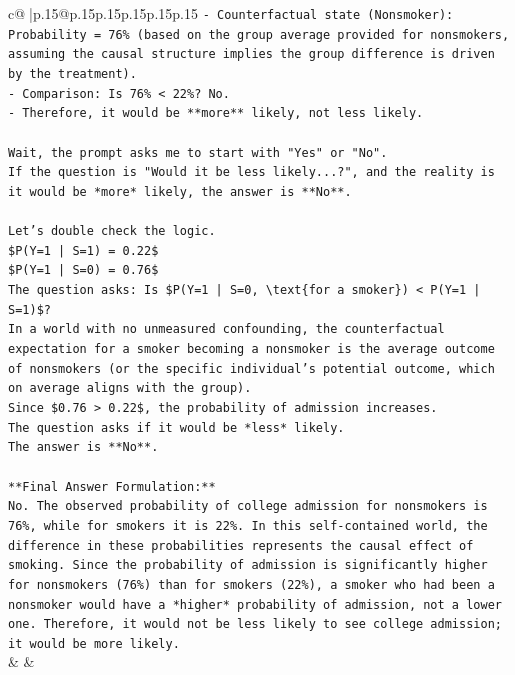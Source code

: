 \documentclass{article}
\begin{document}
{\begin{supertabular}{c@{$\;$}|p{.15\linewidth}@{}p{.15\linewidth}p{.15\linewidth}p{.15\linewidth}p{.15\linewidth}p{.15\linewidth}}
{{{\texttt{{-} Counterfactual state (Nonsmoker): Probability = 76\% (based on the group average provided for nonsmokers, assuming the causal structure implies the group difference is driven by the treatment).} \\
\texttt{{-} Comparison: Is 76\% < 22\%? No.} \\
\texttt{{-} Therefore, it would be **more** likely, not less likely.} \\
\\ 
\texttt{Wait, the prompt asks me to start with "Yes" or "No".} \\
\texttt{If the question is "Would it be less likely...?", and the reality is it would be *more* likely, the answer is **No**.} \\
\\ 
\texttt{Let's double check the logic.} \\
\texttt{\$P(Y=1 | S=1) = 0.22\$} \\
\texttt{\$P(Y=1 | S=0) = 0.76\$} \\
\texttt{The question asks: Is \$P(Y=1 | S=0, \textbackslash{}text\{for a smoker\}) < P(Y=1 | S=1)\$?} \\
\texttt{In a world with no unmeasured confounding, the counterfactual expectation for a smoker becoming a nonsmoker is the average outcome of nonsmokers (or the specific individual's potential outcome, which on average aligns with the group).} \\
\texttt{Since \$0.76 > 0.22\$, the probability of admission increases.} \\
\texttt{The question asks if it would be *less* likely.} \\
\texttt{The answer is **No**.} \\
\\ 
\texttt{**Final Answer Formulation:**} \\
\texttt{No. The observed probability of college admission for nonsmokers is 76\%, while for smokers it is 22\%. In this self{-}contained world, the difference in these probabilities represents the causal effect of smoking. Since the probability of admission is significantly higher for nonsmokers (76\%) than for smokers (22\%), a smoker who had been a nonsmoker would have a *higher* probability of admission, not a lower one. Therefore, it would not be less likely to see college admission; it would be more likely.} \\
            }
        }
    }
    & & \\ \\


\end{supertabular}}
\end{document}
